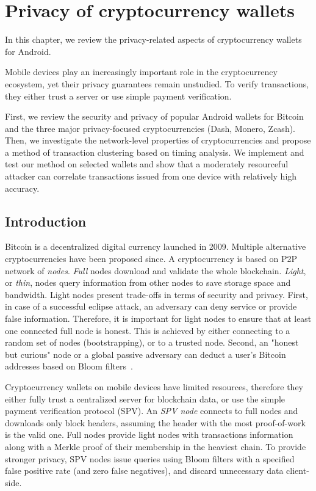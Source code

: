 \chapter{Privacy of cryptocurrency wallets}

\label{Chapter04Wallets}

In this chapter, we review the privacy-related aspects of cryptocurrency wallets for Android.

Mobile devices play an increasingly important role in the cryptocurrency ecosystem, yet their privacy guarantees remain unstudied.
To verify transactions, they either trust a server or use simple payment verification.

First, we review the security and privacy of popular Android wallets for Bitcoin and the three major privacy-focused cryptocurrencies (Dash, Monero, Zcash).
Then, we investigate the network-level properties of cryptocurrencies and propose a method of transaction clustering based on timing analysis.
We implement and test our method on selected wallets and show that a moderately resourceful attacker can correlate transactions issued from one device with relatively high accuracy.

\section{Introduction}

Bitcoin is a decentralized digital currency launched in 2009.
Multiple alternative cryptocurrencies have been proposed since.
A cryptocurrency is based on P2P network of \textit{nodes}.
\textit{Full} nodes download and validate the whole blockchain.
\textit{Light}, or \textit{thin}, nodes query information from other nodes to save storage space and bandwidth.
Light nodes present trade-offs in terms of security and privacy.
First, in case of a successful eclipse attack, an adversary can deny service or provide false information.
Therefore, it is important for light nodes to ensure that at least one connected full node is honest.
This is achieved by either connecting to a random set of nodes (bootstrapping), or to a trusted node.
Second, an "honest but curious" node or a global passive adversary can deduct a user's Bitcoin addresses based on Bloom filters~\cite{Gervais2014}.

Cryptocurrency wallets on mobile devices have limited resources, therefore they either fully trust a centralized server for blockchain data, or use the simple payment verification protocol (SPV).
An \textit{SPV node} connects to full nodes and downloads only block headers, assuming the header with the most proof-of-work is the valid one.
Full nodes provide light nodes with transactions information along with a Merkle proof of their membership in the heaviest chain.
To provide stronger privacy, SPV nodes issue queries using Bloom filters with a specified false positive rate (and zero false negatives), and discard unnecessary data client-side.

